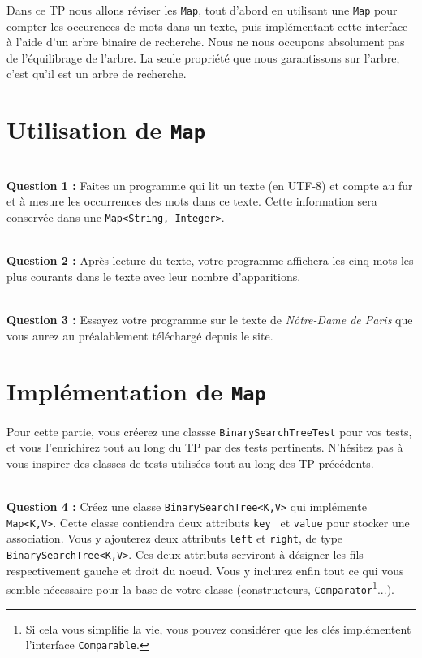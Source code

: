 \documentclass[iutinfo,a4paper,nocorrections,10pt]{ustl-tdtp}
\date{\annee{2018}--\annee{2019}}
\begin{document}
\maketitle
\thispagestyle{empty}
\sloppy


Dans ce TP nous allons réviser les \texttt{Map}, tout d'abord en utilisant une \texttt{Map} pour compter les occurences de mots dans un texte, puis implémentant cette interface à l'aide d'un
arbre binaire de recherche. Nous ne nous occupons absolument pas de
l'équilibrage de l'arbre. La seule propriété que nous garantissons sur
l'arbre, c'est qu'il est un arbre de recherche.

\section*{Utilisation de \texttt{Map}}

~\\ \textbf{Question 1 :} Faites un programme qui lit un texte (en UTF-8) et compte au fur et à mesure les occurrences des mots dans ce texte. Cette information sera conservée dans une \texttt{Map<String, Integer>}.

~\\ \textbf{Question 2 :} Après lecture du texte, votre programme affichera les cinq mots les plus courants dans le texte avec leur nombre d'apparitions. 

~\\ \textbf{Question 3 :} Essayez votre programme sur le texte de \emph{Nôtre-Dame de Paris} que vous aurez au préalablement téléchargé depuis le site.

\section*{Implémentation de \texttt{Map}}

Pour cette partie, vous créerez une classse \texttt{BinarySearchTreeTest} pour vos tests, et vous l'enrichirez tout au long du TP par des tests pertinents. N'hésitez pas à vous inspirer des classes de tests utilisées tout au long des TP précédents.

~\\ \textbf{Question 4 :} Créez une classe \texttt{BinarySearchTree<K,V>} qui
implémente \texttt{Map<K,V>}. Cette classe contiendra deux attributs \texttt{key } et \texttt{value} pour stocker une association. Vous y ajouterez deux 
attributs \texttt{left} et \texttt{right}, de type
\texttt{BinarySearchTree<K,V>}. Ces deux attributs serviront à désigner les fils
respectivement gauche et droit du noeud. Vous y inclurez enfin tout ce qui vous
semble nécessaire pour la base de votre classe
(constructeurs, \texttt{Comparator}\footnote{Si cela vous simplifie la vie, vous pouvez considérer que les clés implémentent l'interface \texttt{Comparable}.}...).
\end{document}

